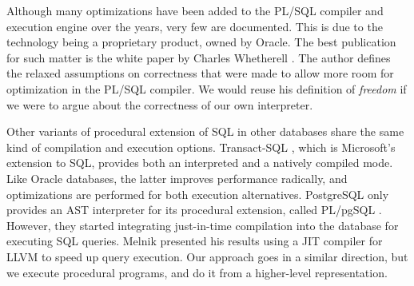\documentclass[twoside,11pt,a4paper]{article}
\begin{document}
%
%

Although many optimizations have been added to the PL/SQL compiler and execution engine over the years, very few are documented. This is due to the technology being a proprietary product, owned by Oracle. The best publication for such matter is the white paper by Charles Whetherell \cite{freedomplsopt}. The author defines the relaxed assumptions on correctness that were made to allow more room for optimization in the PL/SQL compiler. We would reuse his definition of \textit{freedom} if we were to argue about the correctness of our own interpreter.

Other variants of procedural extension of SQL in other databases share the same kind of compilation and execution options. Transact-SQL \cite{tsqldoc}, which is Microsoft's extension to SQL, provides both an interpreted and a natively compiled mode. Like Oracle databases, the latter improves performance radically, and optimizations are performed for both execution alternatives. PostgreSQL only provides an AST interpreter for its procedural extension, called PL/pgSQL \cite{plpgsqldoc}. However, they started integrating just-in-time compilation into the database for executing SQL queries. Melnik \cite{postgresllvmjit} presented his results using a JIT compiler for LLVM to speed up query execution. Our approach goes in a similar direction, but we execute procedural programs, and do it from a higher-level representation.
\end{document}
